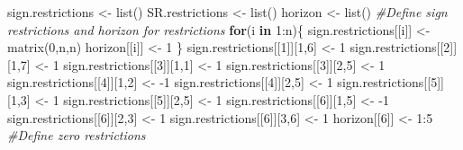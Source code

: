 \documentclass[
  12pt,
]{book}
\newenvironment{Shaded}{\begin{snugshade}}{\end{snugshade}}
\newcommand{\CommentTok}[1]{\textcolor[rgb]{0.56,0.35,0.01}{\textit{#1}}}
\newcommand{\ControlFlowTok}[1]{\textcolor[rgb]{0.13,0.29,0.53}{\textbf{#1}}}
\newcommand{\DecValTok}[1]{\textcolor[rgb]{0.00,0.00,0.81}{#1}}
\newcommand{\FunctionTok}[1]{\textcolor[rgb]{0.00,0.00,0.00}{#1}}
\newcommand{\NormalTok}[1]{#1}
\newcommand{\OtherTok}[1]{\textcolor[rgb]{0.56,0.35,0.01}{#1}}
\newcommand{\SpecialCharTok}[1]{\textcolor[rgb]{0.00,0.00,0.00}{#1}}
\theoremstyle{definition}
\theoremstyle{definition}
\theoremstyle{definition}
\theoremstyle{definition}
\theoremstyle{remark}
\begin{document}
\begin{Shaded}
\begin{Highlighting}[]
\NormalTok{sign.restrictions }\OtherTok{\textless{}{-}} \FunctionTok{list}\NormalTok{()}
\NormalTok{SR.restrictions }\OtherTok{\textless{}{-}} \FunctionTok{list}\NormalTok{()}
\NormalTok{horizon }\OtherTok{\textless{}{-}} \FunctionTok{list}\NormalTok{()}
\CommentTok{\#Define sign restrictions and horizon for restrictions}
\ControlFlowTok{for}\NormalTok{(i }\ControlFlowTok{in} \DecValTok{1}\SpecialCharTok{:}\NormalTok{n)\{}
\NormalTok{  sign.restrictions[[i]] }\OtherTok{\textless{}{-}} \FunctionTok{matrix}\NormalTok{(}\DecValTok{0}\NormalTok{,n,n)}
\NormalTok{  horizon[[i]] }\OtherTok{\textless{}{-}} \DecValTok{1}
\NormalTok{\}}
\NormalTok{sign.restrictions[[}\DecValTok{1}\NormalTok{]][}\DecValTok{1}\NormalTok{,}\DecValTok{6}\NormalTok{] }\OtherTok{\textless{}{-}} \DecValTok{1}
\NormalTok{sign.restrictions[[}\DecValTok{2}\NormalTok{]][}\DecValTok{1}\NormalTok{,}\DecValTok{7}\NormalTok{] }\OtherTok{\textless{}{-}} \DecValTok{1}
\NormalTok{sign.restrictions[[}\DecValTok{3}\NormalTok{]][}\DecValTok{1}\NormalTok{,}\DecValTok{1}\NormalTok{] }\OtherTok{\textless{}{-}} \DecValTok{1}
\NormalTok{sign.restrictions[[}\DecValTok{3}\NormalTok{]][}\DecValTok{2}\NormalTok{,}\DecValTok{5}\NormalTok{] }\OtherTok{\textless{}{-}} \DecValTok{1}
\NormalTok{sign.restrictions[[}\DecValTok{4}\NormalTok{]][}\DecValTok{1}\NormalTok{,}\DecValTok{2}\NormalTok{] }\OtherTok{\textless{}{-}} \SpecialCharTok{{-}}\DecValTok{1}
\NormalTok{sign.restrictions[[}\DecValTok{4}\NormalTok{]][}\DecValTok{2}\NormalTok{,}\DecValTok{5}\NormalTok{] }\OtherTok{\textless{}{-}} \DecValTok{1}
\NormalTok{sign.restrictions[[}\DecValTok{5}\NormalTok{]][}\DecValTok{1}\NormalTok{,}\DecValTok{3}\NormalTok{] }\OtherTok{\textless{}{-}} \DecValTok{1}
\NormalTok{sign.restrictions[[}\DecValTok{5}\NormalTok{]][}\DecValTok{2}\NormalTok{,}\DecValTok{5}\NormalTok{] }\OtherTok{\textless{}{-}} \DecValTok{1}
\NormalTok{sign.restrictions[[}\DecValTok{6}\NormalTok{]][}\DecValTok{1}\NormalTok{,}\DecValTok{5}\NormalTok{] }\OtherTok{\textless{}{-}} \SpecialCharTok{{-}}\DecValTok{1}
\NormalTok{sign.restrictions[[}\DecValTok{6}\NormalTok{]][}\DecValTok{2}\NormalTok{,}\DecValTok{3}\NormalTok{] }\OtherTok{\textless{}{-}} \DecValTok{1}
\NormalTok{sign.restrictions[[}\DecValTok{6}\NormalTok{]][}\DecValTok{3}\NormalTok{,}\DecValTok{6}\NormalTok{] }\OtherTok{\textless{}{-}} \DecValTok{1}
\NormalTok{horizon[[}\DecValTok{6}\NormalTok{]] }\OtherTok{\textless{}{-}} \DecValTok{1}\SpecialCharTok{:}\DecValTok{5}
\CommentTok{\#Define zero restrictions}

\end{Highlighting}
\end{Shaded}
\end{document}
